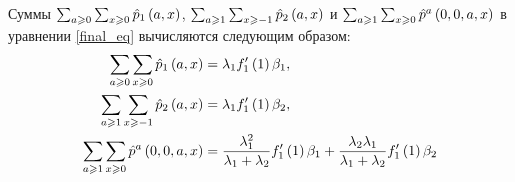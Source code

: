 \documentclass[a4paper,14pt,russian]{article}
\newcommand{\p}{\hat{p}}
\begin{document}
\begin{lemma}
 Суммы $\sum_{a\geqslant 0}\sum_{x\geqslant 0} \p_1\br{a,x}$, $ \sum_{a\geqslant 1}\sum_{x\geqslant -1}\p_2\br{a,x}$ и 
 $\sum_{a\geqslant 1}\sum_{x\geqslant 0}\p^a\br{0,0,a,x}$ в уравнении \eqref{final_eq} вычисляются следующим образом:
 \begin{equation}
 \begin{align*}
 \sum_{a\geqslant 0}\sum_{x\geqslant 0} \p_1\br{a,x} &=  \la_1 f_1'\br{1} \beta_1,\\
\sum_{a\geqslant 1}\sum_{x\geqslant -1}\p_2\br{a,x}  &= \la_1 f_1'\br{1} \beta_2, \\
 \sum_{a\geqslant 1}\sum_{x\geqslant 0}\p^a\br{0,0,a,x} &= \frac{\la_1^2}{\la_1+\la_2} f_1'\br{1} \beta_1 + \frac{\la_2 \la_1}{\la_1+ \la_2}
 f_1'\br{1} \beta_2
\end{align*}
\label{help_sum}
\end{equation}
\end{lemma}
\end{document}
